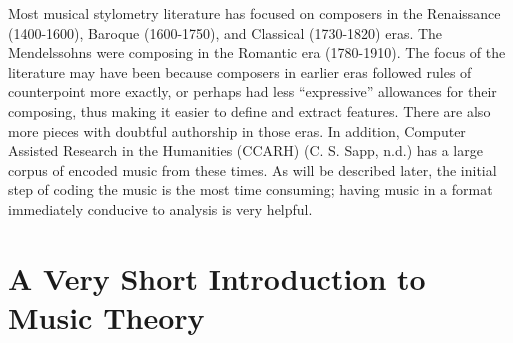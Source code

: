 \documentclass[12pt,twoside]{reedthesis}
\theoremstyle{definition}
\theoremstyle{definition}
\theoremstyle{definition}
\theoremstyle{remark}
\begin{document}
Most musical stylometry literature has focused on composers in the
Renaissance (1400-1600), Baroque (1600-1750), and Classical (1730-1820)
eras. The Mendelssohns were composing in the Romantic era (1780-1910).
The focus of the literature may have been because composers in earlier
eras followed rules of counterpoint more exactly, or perhaps had less
``expressive'' allowances for their composing, thus making it easier to
define and extract features. There are also more pieces with doubtful
authorship in those eras. In addition, Computer Assisted Research in the
Humanities (CCARH) (C. S. Sapp, n.d.) has a large corpus of encoded
music from these times. As will be described later, the initial step of
coding the music is the most time consuming; having music in a format
immediately conducive to analysis is very helpful.

\section{A Very Short Introduction to Music
Theory}\label{a-very-short-introduction-to-music-theory}
\end{document}
